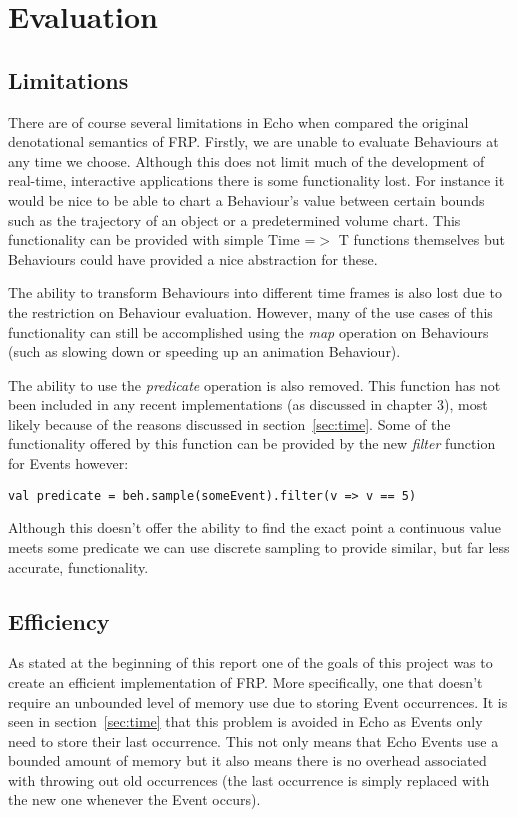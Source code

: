\chapter{Evaluation}    
  \section{Limitations}
    There are of course several limitations in Echo when compared the original denotational semantics of FRP. Firstly, we are 
    unable to evaluate Behaviours at any time we choose.
    Although this does not limit much of the development of real-time, interactive applications there is some functionality
    lost. For instance it would be nice to be able to chart a Behaviour's value between certain bounds such as
    the trajectory of an object or a predetermined volume chart. This functionality can be provided with simple
    Time =$>$ T functions themselves but Behaviours could have provided a nice abstraction for these.
    
    The ability to transform Behaviours into different time frames is also lost due to the restriction on Behaviour
    evaluation. However, many of the use cases of this functionality can still be accomplished using the
    \emph{map} operation on Behaviours (such as slowing down or speeding up an animation Behaviour).
    
    The ability to use the \emph{predicate} operation is also removed. This function has not been included in any
    recent implementations (as discussed in chapter 3), most likely because of the reasons discussed in section~\ref{sec:time}. Some of the functionality offered by this function can be provided by the new \emph{filter} function for
    Events however:
    
\begin{verbatim}
val predicate = beh.sample(someEvent).filter(v => v == 5)
\end{verbatim}

    Although this doesn't offer the ability to find the exact point a continuous value meets some predicate we can
    use discrete sampling to provide similar, but far less accurate, functionality.
    
  \section{Efficiency}
    \label{sec:eff}
    As stated at the beginning of this report one of the goals of this project was to create an efficient implementation
    of FRP. More specifically, one that doesn't require an unbounded level of memory use due to storing Event occurrences.
    It is seen in section~\ref{sec:time} that this problem is avoided in Echo as Events only need to store their last
    occurrence. This not only means that Echo Events use a bounded amount of memory but it also means there is
    no overhead associated with throwing out old occurrences (the last occurrence is simply replaced with the new 
    one whenever the Event occurs).
    
